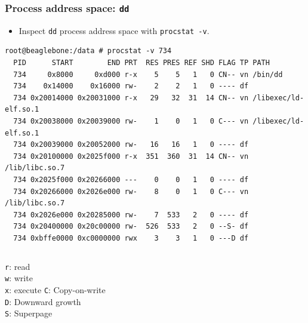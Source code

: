 \begin{frame}[fragile]
  \frametitle{Process address space: \texttt{dd}}

  \pause

  \begin{itemize}
    \item Inspect \texttt{dd} process address space with \texttt{procstat -v}.
  \end{itemize}

  \pause

  \begin{scriptsize}
\begin{verbatim}
root@beaglebone:/data # procstat -v 734
  PID      START        END PRT  RES PRES REF SHD FLAG TP PATH
  734     0x8000     0xd000 r-x    5    5   1   0 CN-- vn /bin/dd
  734    0x14000    0x16000 rw-    2    2   1   0 ---- df 
  734 0x20014000 0x20031000 r-x   29   32  31  14 CN-- vn /libexec/ld-elf.so.1
  734 0x20038000 0x20039000 rw-    1    0   1   0 C--- vn /libexec/ld-elf.so.1
  734 0x20039000 0x20052000 rw-   16   16   1   0 ---- df 
  734 0x20100000 0x2025f000 r-x  351  360  31  14 CN-- vn /lib/libc.so.7
  734 0x2025f000 0x20266000 ---    0    0   1   0 ---- df 
  734 0x20266000 0x2026e000 rw-    8    0   1   0 C--- vn /lib/libc.so.7
  734 0x2026e000 0x20285000 rw-    7  533   2   0 ---- df 
  734 0x20400000 0x20c00000 rw-  526  533   2   0 --S- df 
  734 0xbffe0000 0xc0000000 rwx    3    3   1   0 ---D df 
\end{verbatim}
  \end{scriptsize}

  \pause

  \begin{columns}[T]
	\texttt{r}: read \\
	\texttt{w}: write \\
	\texttt{x}: execute
        \texttt{C}: Copy-on-write \\
	\texttt{D}: Downward growth \\
	\texttt{S}: Superpage
  \end{columns}
\end{frame}

